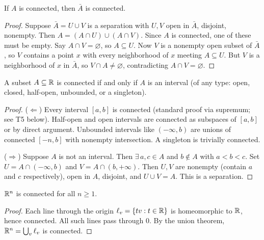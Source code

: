 \documentclass{article}
\begin{document}
\begin{theorem}
  If $A$ is connected, then $\bar{A}$ is connected.
\end{theorem}
\begin{proof}
  Suppose $\bar{A} = U \cup V$ is a separation with $U, V$ open in
  $\bar{A}$, disjoint, nonempty.
  Then $A = (A \cap U) \cup (A \cap V)$. Since $A$ is connected, one
  of these must be empty.
  Say $A \cap V = \varnothing$, so $A \subseteq U$.
  Now $V$ is a nonempty open subset of $\bar{A}$, so $V$ contains a
  point $x$ with
  every neighborhood of $x$ meeting $A \subseteq U$. But $V$ is a
  neighborhood of $x$ in $\bar{A}$,
  so $V \cap A \ne \varnothing$, contradicting $A \cap V = \varnothing$.
\end{proof}

\begin{theorem}
  A subset $A \subseteq \mathbb{R}$ is connected if and only if $A$ is an interval
  (of any type: open, closed, half-open, unbounded, or a singleton).
\end{theorem}
\begin{proof}
  ($\Leftarrow$) Every interval $[a,b]$ is connected (standard proof
  via supremum; see T5 below).
  Half-open and open intervals are connected as subspaces of $[a,b]$
  or by direct argument.
  Unbounded intervals like $(-\infty, b)$ are unions of connected
  $[-n, b]$ with nonempty intersection.
  A singleton is trivially connected.

  ($\Rightarrow$) Suppose $A$ is not an interval. Then $\exists\, a,
  c \in A$ and $b \notin A$ with
  $a < b < c$. Set $U = A \cap (-\infty, b)$ and $V = A \cap (b, +\infty)$.
  Then $U, V$ are nonempty (contain $a$ and $c$ respectively), open in $A$,
  disjoint, and $U \cup V = A$. This is a separation.
\end{proof}

\begin{theorem}[$\R^n$ is connected]
  $\R^n$ is connected for all $n \ge 1$.
\end{theorem}
\begin{proof}
  Each line through the origin $\ell_v = \{tv : t \in \mathbb{R}\}$ is
  homeomorphic to $\mathbb{R}$, hence connected.
  All such lines pass through $0$. By the union theorem, $\mathbb{R}^n =
  \bigcup_v \ell_v$ is connected.
\end{proof}
\end{document}
